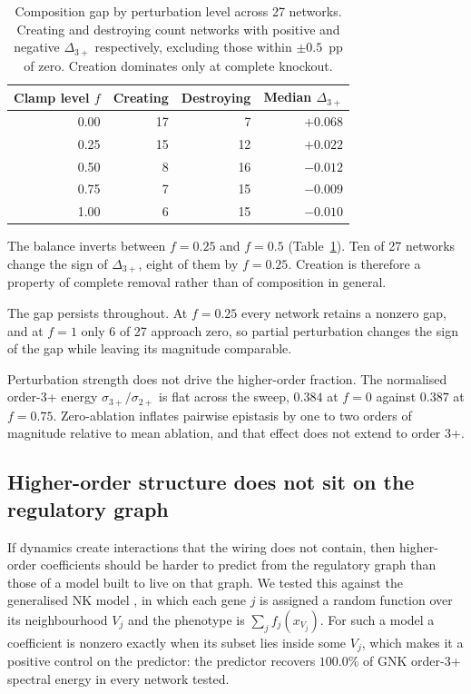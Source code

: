 \documentclass[10pt]{article}
\begin{document}
\begin{table}[h]
\centering\small
\begin{tabular}{rrrr}
\toprule
Clamp level $f$ & Creating & Destroying & Median $\Delta_{3+}$ \\
\midrule
0.00 & 17 & 7  & $+0.068$ \\
0.25 & 15 & 12 & $+0.022$ \\
0.50 & 8  & 16 & $-0.012$ \\
0.75 & 7  & 15 & $-0.009$ \\
1.00 & 6  & 15 & $-0.010$ \\
\bottomrule
\end{tabular}
\caption{Composition gap by perturbation level across 27 networks.
Creating and destroying count networks with positive and negative
$\Delta_{3+}$ respectively, excluding those within $\pm 0.5$~pp of
zero. Creation dominates only at complete knockout.}
\label{tab:graded}
\end{table}

The balance inverts between $f = 0.25$ and $f = 0.5$
(Table~\ref{tab:graded}). Ten of 27 networks change the sign of
$\Delta_{3+}$, eight of them by $f = 0.25$. Creation is therefore a
property of complete removal rather than of composition in general.

The gap persists throughout. At $f = 0.25$ every network retains a
nonzero gap, and at $f = 1$ only 6 of 27 approach zero, so partial
perturbation changes the sign of the gap while leaving its magnitude
comparable.

Perturbation strength does not drive the higher-order fraction. The
normalised order-3+ energy $\sigma_{3+}/\sigma_{2+}$ is flat across the
sweep, $0.384$ at $f = 0$ against $0.387$ at $f = 0.75$. Zero-ablation
inflates pairwise epistasis by one to two orders of magnitude relative
to mean ablation, and that effect does not extend to order 3+.


\subsection{Higher-order structure does not sit on the regulatory graph}
\label{sec:gnk}

If dynamics create interactions that the wiring does not contain, then
higher-order coefficients should be harder to predict from the
regulatory graph than those of a model built to live on that graph. We
tested this against the generalised NK model \citep{brookes2022sparsity},
in which each gene $j$ is assigned a random function over its
neighbourhood $V_j$ and the phenotype is $\sum_j f_j(x_{V_j})$. For such
a model a coefficient is nonzero exactly when its subset lies inside
some $V_j$, which makes it a positive control on the predictor: the
predictor recovers $100.0\%$ of GNK order-3+ spectral energy in every
network tested.
\end{document}
